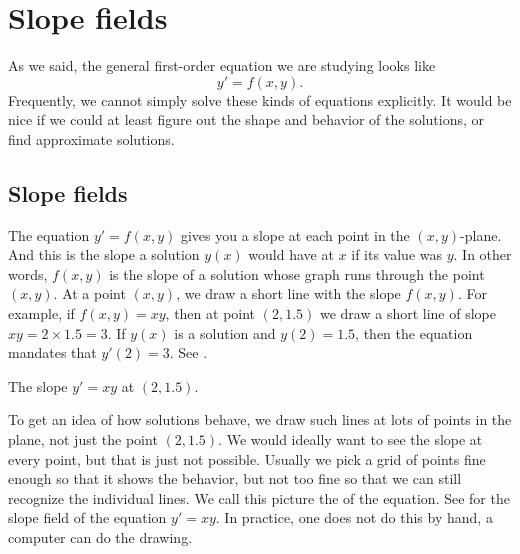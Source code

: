 
\sectionnewpage
\section{Slope fields}
\label{slopefields:section}



%

As we said, the general first-order equation we are studying looks like
\begin{equation*}
y' = f(x,y).
\end{equation*}
Frequently, we cannot simply solve these kinds of equations explicitly.
It would be nice if we could at least figure out the shape and behavior of
the solutions, or find approximate solutions.

\subsection{Slope fields}

The equation $y' = f(x,y)$
gives you a slope at each point 
in the
$(x,y)$-plane.  And this is the slope a solution $y(x)$ would have 
at $x$ if its value was $y$.  In other words, $f(x,y)$ is the slope
of a solution whose graph runs through the
point $(x,y)$.  At a point $(x,y)$, we draw a short line
with the slope $f(x,y)$.
For example, if $f(x,y) = xy$, then at point $(2,1.5)$ we draw a
short line of slope $xy = 2 \times 1.5 = 3$.  If $y(x)$ is a solution
and $y(2) = 1.5$, then the equation mandates that $y'(2) = 3$.
See .

\begin{myfig}
\capstart
{}
\caption{The slope $y'=xy$ at $(2,1.5)$.\label{1.3:fig0}}
\end{myfig}

To get an idea of how solutions behave, we draw such lines at lots
of points in the plane, not just the point $(2,1.5)$.  We would
ideally want to see the slope at every point, but that is
just not possible.  Usually we pick a
grid of points fine enough so that it shows the behavior, but not too
fine so that we can still recognize the individual lines.
We call this picture the \emph{} of the equation.
See  for the slope field of the equation $y' = xy$.
In practice, one does not do this by hand, a computer can do the
drawing.

